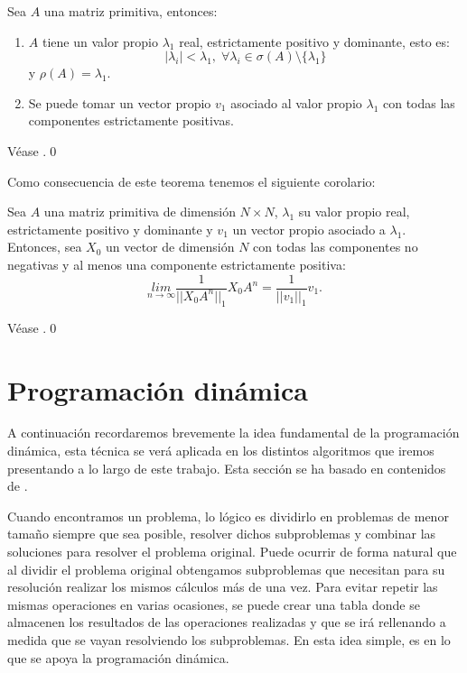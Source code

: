 \begin{theorem} \label{Perron-Frobenius}
    Sea $A$ una matriz primitiva, entonces:
    \begin{enumerate}
        \item $A$ tiene un valor propio $\lambda_1$ real, estrictamente positivo y dominante, esto es:
        \[|\lambda_i|<\lambda_1,\; \forall\lambda_i\in\sigma(A)\setminus \{\lambda_1\}\]
        y $\rho(A)=\lambda_1$.
        \item Se puede tomar un vector propio $v_1$ asociado al valor propio $\lambda_1$ con todas las componentes estrictamente positivas.
    \end{enumerate}
\end{theorem}
\begin{proofs*}
    Véase \cite[Página 202]{Salinelli}.\qed
\end{proofs*}
Como consecuencia de este teorema tenemos el siguiente corolario:
\begin{corollary} \label{colorarioPerron}
    Sea $A$ una matriz primitiva de dimensión $N\times N$, $\lambda_1$ su valor propio real, estrictamente positivo y dominante y $v_1$ un vector propio asociado a $\lambda_1$. Entonces, sea $X_0$ un vector de dimensión $N$ con todas las componentes no negativas y al menos una componente estrictamente positiva:
    \[\underset{n\rightarrow\infty}{lim}\frac{1}{||X_0A^n||_1}X_0A^n=\frac{1}{||v_1||_1}v_1.\]
\end{corollary}
\begin{proofs*}
    Véase \cite[Página 201, Teorema 5.19]{Salinelli}.\qed
\end{proofs*}

\section{Programación dinámica}
A continuación recordaremos brevemente la idea fundamental de la programación dinámica, esta técnica se verá aplicada en los distintos algoritmos que iremos presentando a lo largo de este trabajo. Esta sección se ha basado en contenidos de \cite{algoritmia}.

Cuando encontramos un problema, lo lógico es dividirlo en problemas de menor tamaño siempre que sea posible, resolver dichos subproblemas y combinar las soluciones para resolver el problema original. Puede ocurrir de forma natural que al dividir el problema original obtengamos subproblemas que necesitan para su resolución realizar los mismos cálculos más de una vez. Para evitar repetir las mismas operaciones en varias ocasiones, se puede crear una tabla donde se almacenen los resultados de las operaciones realizadas y que se irá rellenando a medida que se vayan resolviendo los subproblemas. En esta idea simple, es en lo que se apoya la programación dinámica.

